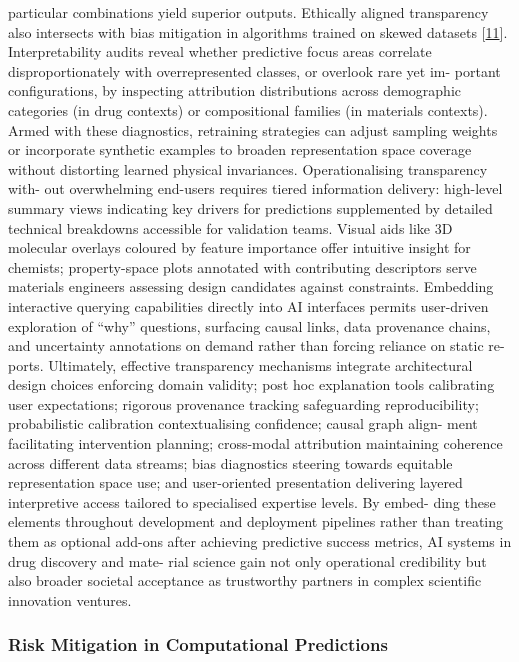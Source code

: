 \documentclass[
]{article}
\begin{document}
particular combinations yield superior outputs. Ethically aligned
transparency also intersects with bias mitigation in algorithms trained
on skewed datasets {[}\hyperref[_bookmark51]{11}{]}. Interpretability
audits reveal whether predictive focus areas correlate
disproportionately with overrepresented classes, or overlook rare yet
im- portant configurations, by inspecting attribution distributions
across demographic categories (in drug contexts) or compositional
families (in materials contexts). Armed with these diagnostics,
retraining strategies can adjust sampling weights or incorporate
synthetic examples to broaden representation space coverage without
distorting learned physical invariances. Operationalising transparency
with- out overwhelming end-users requires tiered information delivery:
high-level summary views indicating key drivers for predictions
supplemented by detailed technical breakdowns accessible for validation
teams. Visual aids like 3D molecular overlays coloured by feature
importance offer intuitive insight for chemists; property-space plots
annotated with contributing descriptors serve materials engineers
assessing design candidates against constraints. Embedding interactive
querying capabilities directly into AI interfaces permits user-driven
exploration of ``why'' questions, surfacing causal links, data
provenance chains, and uncertainty annotations on demand rather than
forcing reliance on static re- ports. Ultimately, effective transparency
mechanisms integrate architectural design choices enforcing domain
validity; post hoc explanation tools calibrating user expectations;
rigorous provenance tracking safeguarding reproducibility; probabilistic
calibration contextualising confidence; causal graph align- ment
facilitating intervention planning; cross-modal attribution maintaining
coherence across different data streams; bias diagnostics steering
towards equitable representation space use; and user-oriented
presentation delivering layered interpretive access tailored to
specialised expertise levels. By embed- ding these elements throughout
development and deployment pipelines rather than treating them as
optional add-ons after achieving predictive success metrics, AI systems
in drug discovery and mate- rial science gain not only operational
credibility but also broader societal acceptance as trustworthy partners
in complex scientific innovation ventures.

\subsubsection{Risk Mitigation in Computational
Predictions}\label{risk-mitigation-in-computational-predictions}
\end{document}
